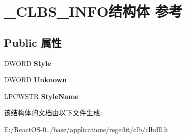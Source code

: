 \hypertarget{struct___c_l_b_s___i_n_f_o}{}\section{\+\_\+\+C\+L\+B\+S\+\_\+\+I\+N\+F\+O结构体 参考}
\label{struct___c_l_b_s___i_n_f_o}
\subsection*{Public 属性}
\begin{DoxyCompactItemize}
\item 
\mbox{\label{struct___c_l_b_s___i_n_f_o_a198328b52d53d2d942cfc8aa0ac1c3ad}} 
D\+W\+O\+RD {\bfseries Style}
\item 
\mbox{\label{struct___c_l_b_s___i_n_f_o_ac58997990af4dc0a4cee44d03431bb98}} 
D\+W\+O\+RD {\bfseries Unknown}
\item 
\mbox{\label{struct___c_l_b_s___i_n_f_o_a2df43c2b45369609db151e48247665ac}} 
L\+P\+C\+W\+S\+TR {\bfseries Style\+Name}
\end{DoxyCompactItemize}


该结构体的文档由以下文件生成\+:\begin{DoxyCompactItemize}
\item 
E\+:/\+React\+O\+S-\/0../base/applications/regedit/clb/clbdll.\+h\end{DoxyCompactItemize}

